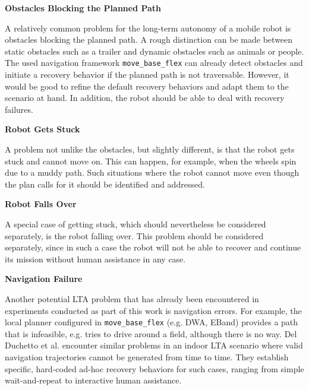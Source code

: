 \documentclass[english, master, utf8]{base/thesis_KBS}
\newcommand{\code}[1]{\colorbox{light-gray}{\texttt{#1}}}
\begin{document}
\noindent
\textbf{Obstacles Blocking the Planned Path}\newline

\noindent
A relatively common problem for the long-term autonomy of a mobile robot is obstacles blocking the planned path.
A rough distinction can be made between static obstacles such as a trailer and dynamic obstacles such as animals or people.
The used navigation framework \code{move\_base\_flex} can already detect obstacles and initiate a recovery behavior if the planned path is not traversable.
However, it would be good to refine the default recovery behaviors and adapt them to the scenario at hand. In addition, the robot should be able to deal with
recovery failures.\newline

\noindent
\textbf{Robot Gets Stuck}\newline

\noindent
A problem not unlike the obstacles, but slightly different, is that the robot gets stuck and cannot move on. This can happen, for example, when the wheels spin due 
to a muddy path. Such situations where the robot cannot move even though the plan calls for it should be identified and addressed.\newline

\noindent
\textbf{Robot Falls Over}\newline

\noindent
A special case of getting stuck, which should nevertheless be considered separately, is the robot falling over.
This problem should be considered separately, since in such a case the robot will not be able to recover and continue its mission without human assistance in any case.\newline

\noindent
\textbf{Navigation Failure}\newline

\noindent
Another potential LTA problem that has already been encountered in experiments conducted as part of this work is navigation errors.
For example, the local planner configured in \code{move\_base\_flex} (e.g. DWA, EBand) provides a path that is infeasible, e.g. tries to drive around a field, 
although there is no way. Del Duchetto et al. encounter similar problems in an indoor LTA scenario where valid navigation trajectories cannot be generated from time to time.
They establish specific, hard-coded ad-hoc recovery behaviors for such cases, ranging from simple wait-and-repeat to interactive human assistance. \cite{DelDuchetto:2018}\newline
\end{document}
